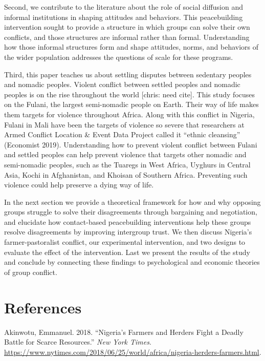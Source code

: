 \documentclass[11pt]{article}
\begin{document}
Second, we contribute to the literature about the role of social
diffusion and informal institutions in shaping attitudes and behaviors.
This peacebuilding intervention sought to provide a structure in which
groups can solve their own conflicts, and those structures are informal
rather than formal. Understanding how those informal structures form and
shape attitudes, norms, and behaviors of the wider population addresses
the questions of scale for these programs.

Third, this paper teaches us about settling disputes between sedentary
peoples and nomadic peoples. Violent conflict between settled peoples
and nomadic peoples is on the rise throughout the world {[}chris: need
cite{]}. This study focuses on the Fulani, the largest semi-nomadic
people on Earth. Their way of life makes them targets for violence
throughout Africa. Along with this conflict in Nigeria, Fulani in Mali
have been the targets of violence so severe that researchers at Armed
Conflict Location \& Event Data Project called it ``ethnic cleansing''
(Economist 2019). Understanding how to prevent violent conflict between
Fulani and settled peoples can help prevent violence that targets other
nomadic and semi-nomadic peoples, such as the Tuaregs in West Africa,
Uyghurs in Central Asia, Kochi in Afghanistan, and Khoisan of Southern
Africa. Preventing such violence could help preserve a dying way of
life.

In the next section we provide a theoretical framework for how and why
opposing groups struggle to solve their disagreements through bargaining
and negotiation, and elucidate how contact-based peacebuilding
interventions help these groups resolve disagreements by improving
intergroup trust. We then discuss Nigeria's farmer-pastoralist conflict,
our experimental intervention, and two designs to evaluate the effect of
the intervention. Last we present the results of the study and conclude
by connecting these findings to psychological and economic theories of
group conflict.

\hypertarget{references}{%
\section*{References}\label{references}}

\hypertarget{refs}{}
\leavevmode\hypertarget{ref-nyt2018nigeria}{}%
Akinwotu, Emmanuel. 2018. ``Nigeria's Farmers and Herders Fight a Deadly
Battle for Scarce Resources.'' \emph{New York Times}.
\url{https://www.nytimes.com/2018/06/25/world/africa/nigeria-herders-farmers.html}.
\end{document}
